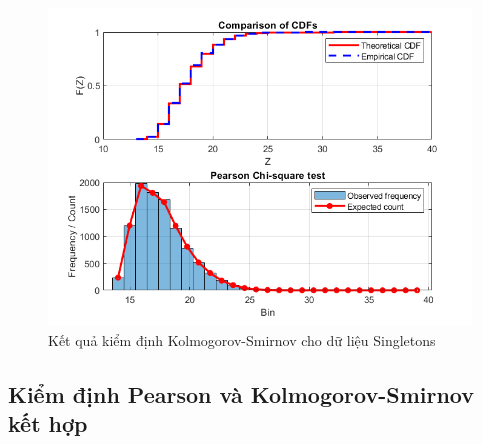 \begin{figure}[h!]
    \centering
    \includegraphics[width=0.8\linewidth]{../../assets/images/KS_fig_Singletons.png}
    \caption{Kết quả kiểm định Kolmogorov-Smirnov cho dữ liệu Singletons}
\end{figure}

\subsection{Kiểm định Pearson và Kolmogorov-Smirnov kết hợp}

